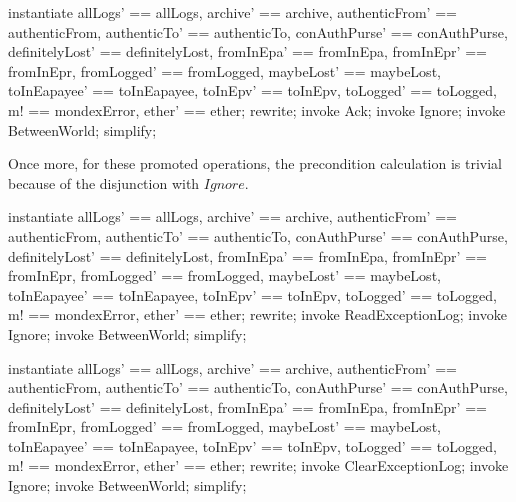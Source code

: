 \begin{LPScript}\begin{zproof}[tBetwAckIsTotal]
   instantiate
      allLogs' == allLogs, archive' == archive,
      authenticFrom' == authenticFrom, authenticTo' == authenticTo,
      conAuthPurse' == conAuthPurse, definitelyLost' == definitelyLost,
      fromInEpa' == fromInEpa, fromInEpr' == fromInEpr,
      fromLogged' == fromLogged, maybeLost' == maybeLost,
      toInEapayee' == toInEapayee, toInEpv' == toInEpv,
      toLogged' == toLogged, m! == mondexError, ether' == ether;
    rewrite;
    invoke Ack;
    invoke Ignore;
    invoke \Xi BetweenWorld;
    simplify;
\end{zproof}\end{LPScript}

Once more, for these promoted operations, the precondition
calculation is trivial because of the disjunction with $Ignore$.
%
\begin{LPScript}\begin{zproof}[tBetwReadExceptionLogIsTotal]
   instantiate
      allLogs' == allLogs, archive' == archive,
      authenticFrom' == authenticFrom, authenticTo' == authenticTo,
      conAuthPurse' == conAuthPurse, definitelyLost' == definitelyLost,
      fromInEpa' == fromInEpa, fromInEpr' == fromInEpr,
      fromLogged' == fromLogged, maybeLost' == maybeLost,
      toInEapayee' == toInEapayee, toInEpv' == toInEpv,
      toLogged' == toLogged, m! == mondexError, ether' == ether;
    rewrite;
    invoke ReadExceptionLog;
    invoke Ignore;
    invoke \Xi BetweenWorld;
    simplify;
\end{zproof}\end{LPScript}

\begin{LPScript}\begin{zproof}[tBetwClearExceptionLogIsTotal]
   instantiate
      allLogs' == allLogs, archive' == archive,
      authenticFrom' == authenticFrom, authenticTo' == authenticTo,
      conAuthPurse' == conAuthPurse, definitelyLost' == definitelyLost,
      fromInEpa' == fromInEpa, fromInEpr' == fromInEpr,
      fromLogged' == fromLogged, maybeLost' == maybeLost,
      toInEapayee' == toInEapayee, toInEpv' == toInEpv,
      toLogged' == toLogged, m! == mondexError, ether' == ether;
    rewrite;
    invoke ClearExceptionLog;
    invoke Ignore;
    invoke \Xi BetweenWorld;
    simplify;
\end{zproof}\end{LPScript}

